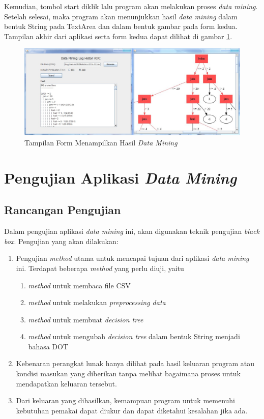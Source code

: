 Kemudian, tombol start diklik lalu program akan melakukan proses \textsl{data mining}. Setelah selesai, maka program akan menunjukkan hasil \textsl{data mining} dalam bentuk String pada TextArea dan dalam bentuk gambar pada form kedua. Tampilan akhir dari aplikasi serta form kedua dapat dilihat di gambar \ref{fig:GUI5}.

\begin{figure}[H]
\centering
\includegraphics[scale=0.5]{Gambar/GUI5.jpg}
\caption[Tampilan Form Menampilkan Hasil \textsl{Data Mining}]{Tampilan Form Menampilkan Hasil \textsl{Data Mining}} 
\label{fig:GUI5}
\end{figure}

\section{Pengujian Aplikasi \textsl{Data Mining}}

\subsection{Rancangan Pengujian}

Dalam pengujian aplikasi \textsl{data mining} ini, akan digunakan teknik pengujian \textsl{black box}. Pengujian yang akan dilakukan:
\begin{enumerate}
	\item Pengujian \textsl{method} utama untuk mencapai tujuan dari aplikasi \textsl{data mining} ini. Terdapat beberapa \textsl{method} yang perlu diuji, yaitu
	\begin{enumerate}
		\item \textsl{method} untuk membaca file CSV
		\item \textsl{method} untuk melakukan \textsl{preprocessing data}
		\item \textsl{method} untuk membuat \textsl{decision tree}
		\item \textsl{method} untuk mengubah \textsl{decision tree} dalam bentuk String menjadi bahasa DOT
	\end{enumerate}
	\item Kebenaran perangkat lunak hanya dilihat pada hasil keluaran program atau kondisi masukan yang diberikan tanpa melihat bagaimana proses untuk mendapatkan keluaran tersebut.
	\item Dari keluaran yang dihasilkan, kemampuan program untuk memenuhi kebutuhan pemakai dapat diukur dan dapat diketahui kesalahan jika ada.
\end{enumerate}


